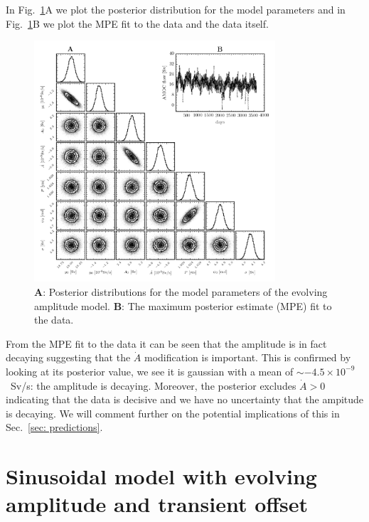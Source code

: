 \documentclass{article}
\begin{document}
In Fig.~\ref{fig: decay amplitude}A we plot the posterior distribution for the
model parameters and in Fig.~\ref{fig: decay amplitude}B we plot the MPE fit to
the data and the data itself.
\begin{figure}[htb]
\centering
\includegraphics[width=0.8\textwidth]{img/BasicSinusoidAmplitudeDecay_PosteriorWithFit}
\caption{\textbf{A}: Posterior distributions for the model parameters of the
evolving amplitude model. \textbf{B}: The maximum posterior estimate (MPE) fit
to the data.}
\label{fig: decay amplitude}
\end{figure}
From the MPE fit to the data it can be seen that the amplitude is in fact
decaying suggesting that the $\dot{A}$ modification is important. This is
confirmed by looking at its posterior value, we see it is gaussian with a mean
of $\sim-4.5\times10^{-9}$~Sv/s: the amplitude is decaying. Moreover, the
posterior excludes $\dot{A}>0$ indicating that the data is decisive and we have
no uncertainty that the ampitude is decaying. We will comment further on the
potential implications of this in Sec.~\ref{sec: predictions}.

\section{Sinusoidal model with evolving amplitude and transient offset}
\end{document}
